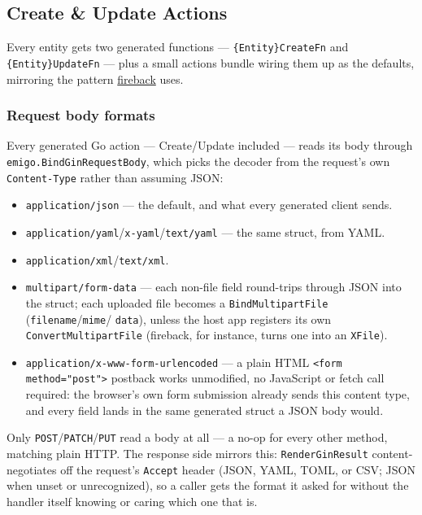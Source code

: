 \subsection{Create \& Update Actions}
\label{sec:go-actions}

Every entity gets two generated functions --- \texttt{\{Entity\}CreateFn}
and \texttt{\{Entity\}UpdateFn} --- plus a small actions bundle wiring
them up as the defaults, mirroring the pattern
\href{https://github.com/torabian/fireback}{fireback} uses.

\subsubsection{Request body formats}
Every generated Go action --- Create/Update included --- reads its body
through \texttt{emigo.BindGinRequestBody}, which picks the decoder from
the request's own \texttt{Content-Type} rather than assuming JSON:
\begin{itemize}[leftmargin=1.1em,itemsep=2pt,topsep=2pt]
  \item \texttt{application/json} --- the default, and what every
    generated client sends.
  \item \texttt{application/yaml}/\texttt{x-yaml}/\texttt{text/yaml}
    --- the same struct, from YAML.
  \item \texttt{application/xml}/\texttt{text/xml}.
  \item \texttt{multipart/form-data} --- each non-file field round-trips
    through JSON into the struct; each uploaded file becomes a
    \texttt{BindMultipartFile} (\texttt{filename}/\texttt{mime}/
    \texttt{data}), unless the host app registers its own
    \texttt{ConvertMultipartFile} (fireback, for instance, turns one into
    an \texttt{XFile}).
  \item \texttt{application/x-www-form-urlencoded} --- a plain HTML
    \texttt{<form method="post">} postback works unmodified, no
    JavaScript or fetch call required: the browser's own form submission
    already sends this content type, and every field lands in the same
    generated struct a JSON body would.
\end{itemize}
Only \texttt{POST}/\texttt{PATCH}/\texttt{PUT} read a body at all --- a
no-op for every other method, matching plain HTTP. The response side
mirrors this: \texttt{RenderGinResult} content-negotiates off the
request's \texttt{Accept} header (JSON, YAML, TOML, or CSV; JSON when
unset or unrecognized), so a caller gets the format it asked for without
the handler itself knowing or caring which one that is.

